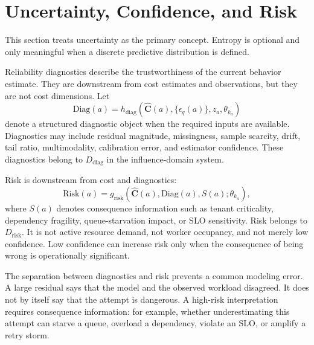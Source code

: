 \section{Uncertainty, Confidence, and Risk}
\label{sec:entropy-confidence-risk}

This section treats uncertainty as the primary concept. Entropy is optional and
only meaningful when a discrete predictive distribution is defined.

Reliability diagnostics describe the trustworthiness of the current behavior
estimate. They are downstream from cost estimates and observations, but they are
not cost dimensions. Let
\[
\mathrm{Diag}(a)
=
h_{\mathrm{diag}}\!\left(
\widehat{\mathbf{C}}(a),
\{\epsilon_q(a)\},
z_a,
\theta_{k_a}
\right)
\]
denote a structured diagnostic object when the required inputs are available.
Diagnostics may include residual magnitude, missingness, sample scarcity, drift,
tail ratio, multimodality, calibration error, and estimator confidence. These
diagnostics belong to $D_{\mathrm{diag}}$ in the influence-domain system.

Risk is downstream from cost and diagnostics:
\[
\mathrm{Risk}(a)
=
g_{\mathrm{risk}}\!\left(
\widehat{\mathbf{C}}(a),
\mathrm{Diag}(a),
S(a);
\theta_{k_a}
\right),
\]
where $S(a)$ denotes consequence information such as tenant criticality,
dependency fragility, queue-starvation impact, or SLO sensitivity. Risk belongs
to $D_{\mathrm{risk}}$. It is not active resource demand, not worker occupancy,
and not merely low confidence. Low confidence can increase risk only when the
consequence of being wrong is operationally significant.

The separation between diagnostics and risk prevents a common modeling error. A
large residual says that the model and the observed workload disagreed. It does
not by itself say that the attempt is dangerous. A high-risk interpretation
requires consequence information: for example, whether underestimating this
attempt can starve a queue, overload a dependency, violate an SLO, or amplify a
retry storm.
